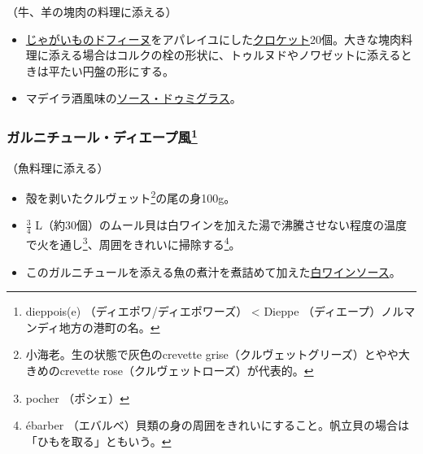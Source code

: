 \begin{recette}

（牛、羊の塊肉の料理に添える）

\begin{itemize}
\item
  \protect\hyperlink{pomme-de-terres-dauphine}{じゃがいものドフィーヌ}をアパレイユにした\protect\hyperlink{croquettes}{クロケット}20個。大きな塊肉料理に添える場合はコルクの栓の形状に、トゥルヌドやノワゼットに添えるときは平たい円盤の形にする。
\item
  マデイラ酒風味の\protect\hyperlink{sauce-demi-glace}{ソース・ドゥミグラス}。
\end{itemize}

\hypertarget{garniture-a-la-dieppoise}{%
\subsubsection[ガルニチュール・ディエープ風]{\texorpdfstring{ガルニチュール・ディエープ風\footnote{dieppois(e)
  （ディエポワ/ディエポワーズ） \textless{} Dieppe
  （ディエープ）ノルマンディ地方の港町の名。}}{ガルニチュール・ディエープ風}}\label{garniture-a-la-dieppoise}}



（魚料理に添える）

\begin{itemize}
\item
  殻を剥いたクルヴェット\footnote{小海老。生の状態で灰色のcrevette
    grise（クルヴェットグリーズ）とやや大きめのcrevette
    rose（クルヴェットローズ）が代表的。}の尾の身100g。
\item
  \(\frac{3}{4}\)
  L（約30個）のムール貝は白ワインを加えた湯で沸騰させない程度の温度で火を通し\footnote{pocher
    （ポシェ）}、周囲をきれいに掃除する\footnote{ébarber
    （エバルベ）貝類の身の周囲をきれいにすること。帆立貝の場合は「ひもを取る」ともいう。}。
\item
  このガルニチュールを添える魚の煮汁を煮詰めて加えた\protect\hyperlink{sauce-vin-blanc}{白ワインソース}。
\end{itemize}


\end{recette}
